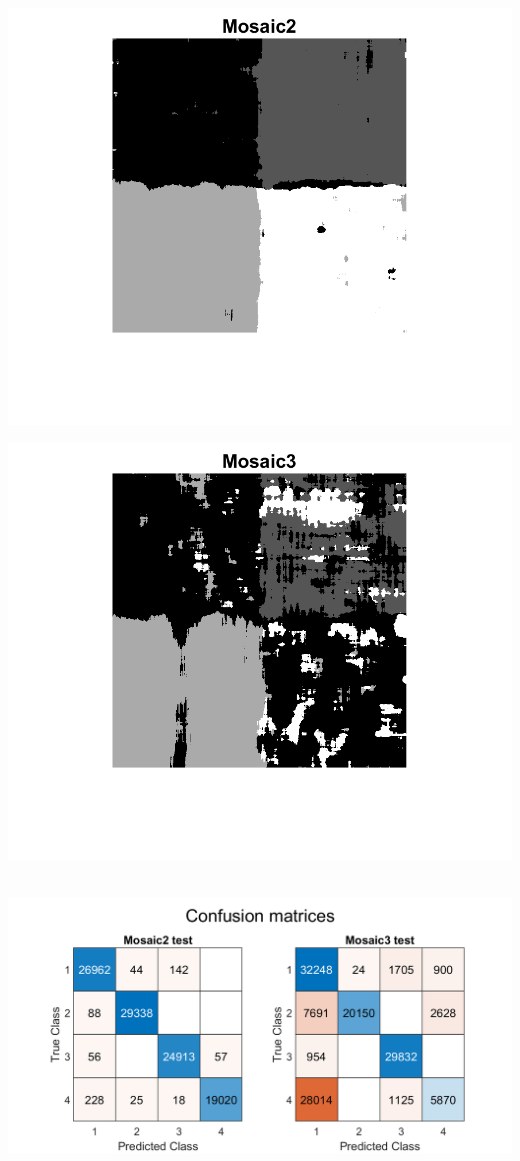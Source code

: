 \documentclass[12pt, letterpaper, twoside]{article}
\begin{document}
\begin{minipage}{0.45\textwidth}
\includegraphics[scale=0.4]{"result_mosaic2"}\\
\end{minipage}%
\hfill
\begin{minipage}{0.45\textwidth}
\includegraphics[scale=0.4]{"result_mosaic3"}\\
\end{minipage}%
\ \\
\includegraphics[scale=0.48]{"conf2"}\\
\end{document}
